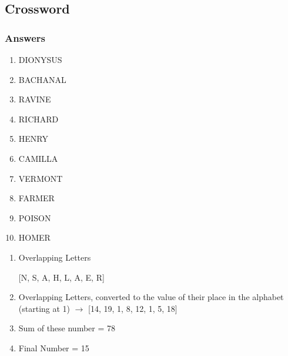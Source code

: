 \subsection{Crossword}

\subsubsection{Answers}

\begin{enumerate}
  \item DIONYSUS
  \item BACHANAL
  \item RAVINE
  \item RICHARD
  \item HENRY
  \item CAMILLA
  \item VERMONT
  \item FARMER
  \item POISON
  \item HOMER
\end{enumerate}

\begin{enumerate}

\item Overlapping Letters

[N, S, A, H, L, A, E, R] \\

\item Overlapping Letters, converted to the value of their place in the alphabet (starting at 1) $\rightarrow$ [14, 19, 1, 8, 12, 1, 5, 18] \\

\item Sum of these number = 78 \\

\item Final Number = 15 \\

\end{enumerate}
